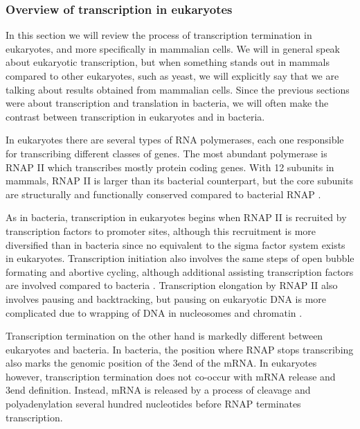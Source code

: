 %
\subsubsection{Overview of transcription in eukaryotes}
In this section we will review the process of transcription termination in
eukaryotes, and more specifically in mammalian cells. We will in general speak
about eukaryotic transcription, but when something stands out in mammals
compared to other eukaryotes, such as yeast, we will explicitly say that we are
talking about results obtained from mammalian cells. Since the previous
sections were about transcription and translation in bacteria, we will often
make the contrast between transcription in eukaryotes and in bacteria.

In eukaryotes there are several types of RNA polymerases, each one responsible
for transcribing different classes of genes. The most abundant polymerase is
RNAP II which transcribes mostly protein coding genes. With 12 subunits in
mammals, RNAP II is larger than its bacterial counterpart, but the core
subunits are structurally and functionally conserved compared to bacterial RNAP
\cite{ebright_rna_2000}.

As in bacteria, transcription in eukaryotes begins when RNAP II is recruited by
transcription factors to promoter sites, although this recruitment is more
diversified than in bacteria since no equivalent to the sigma factor system
exists in eukaryotes. Transcription initiation also involves the same steps of
open bubble formating and abortive cycling, although additional assisting
transcription factors are involved compared to bacteria
\cite{wade_transition_2008}. Transcription elongation by RNAP II also involves
pausing and backtracking, but pausing on eukaryotic DNA is more complicated due
to wrapping of DNA in nucleosomes and chromatin \cite{sims_elongation_2004}.

Transcription termination on the other hand is markedly different between
eukaryotes and bacteria. In bacteria, the position where RNAP stops
transcribing also marks the genomic position of the 3\p end of the mRNA. In
eukaryotes however, transcription termination does not co-occur with mRNA
release and 3\p end definition. Instead, mRNA is released by a process of
cleavage and polyadenylation several hundred nucleotides before RNAP terminates
transcription.

